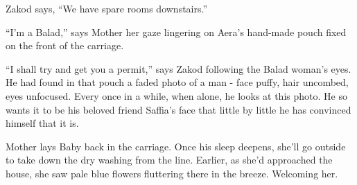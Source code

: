 \documentclass[twoside,11pt]{book}
\begin{document}
Zakod says, ``We have spare rooms downstairs.''

``I'm a Balad,'' says Mother her gaze lingering on Aera's hand-made pouch fixed on the front
of the carriage.

``I shall try and get you a permit,'' says Zakod following the Balad woman's eyes. He had
found in that pouch a faded photo of a man - face puffy, hair uncombed, eyes unfocused. Every once in a while, when
alone, he looks at this photo. He so wants it to be his beloved friend Saffia's face that little by little he has
convinced himself that it is.

Mother lays Baby back in the carriage. Once his sleep deepens, she'll go outside to take down the dry washing from the
line. Earlier, as she'd approached the house, she saw pale blue flowers fluttering there in the breeze. Welcoming her.
\end{document}
